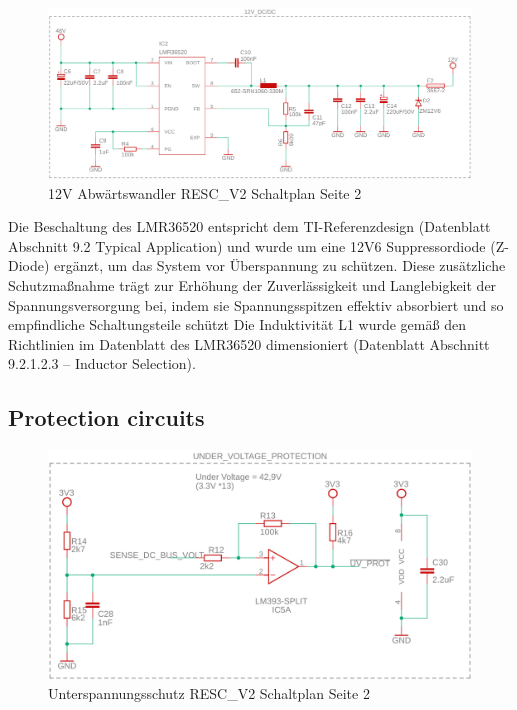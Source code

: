 \documentclass[paper=a4,11pt]{scrreprt}
\begin{document}
\begin{figure}[ht]
\begin{center}
\includegraphics[width=12cm]{Bilder/DCDC.PNG}
\caption{12V Abwärtswandler RESC\_V2 Schaltplan Seite 2}
\label{DCDC}
\end{center}
\end{figure}

Die Beschaltung des LMR36520 entspricht dem TI-Referenzdesign (Datenblatt Abschnitt 9.2 Typical Application) und wurde um eine 12V6 Suppressordiode (Z-Diode) ergänzt, um das System vor Überspannung zu schützen. Diese zusätzliche Schutzmaßnahme trägt zur Erhöhung der Zuverlässigkeit und Langlebigkeit der Spannungsversorgung bei, indem sie Spannungsspitzen effektiv absorbiert und so empfindliche Schaltungsteile schützt
Die Induktivität L1 wurde gemäß den Richtlinien im Datenblatt des LMR36520 dimensioniert (Datenblatt Abschnitt 9.2.1.2.3 – Inductor Selection).

\subsection{Protection circuits}

\begin{figure}[ht]
\begin{center}
\includegraphics[width=12cm]{Bilder/Protection circuit.PNG}
\caption{Unterspannungsschutz RESC\_V2 Schaltplan Seite 2}
\label{UV}
\end{center}
\end{figure}
\end{document}
